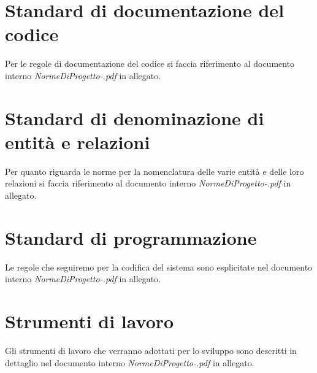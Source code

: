 \section{Standard di documentazione del codice}
Per le regole di documentazione del codice si faccia riferimento al documento
interno \emph{NormeDiProgetto-\versionenormeprogetto.pdf} in allegato.

\section{Standard di denominazione di entit\`a e relazioni}
Per quanto riguarda le norme per la nomenclatura delle varie entit\`a e delle
loro relazioni si faccia riferimento al documento interno
\emph{NormeDiProgetto-\versionenormeprogetto.pdf} in allegato.

\section{Standard di programmazione}
Le regole che seguiremo per la codifica del sistema sono esplicitate nel
documento interno \emph{NormeDiProgetto-\versionenormeprogetto.pdf} in allegato.

\section{Strumenti di lavoro}
Gli strumenti di lavoro che verranno adottati per lo sviluppo sono descritti in
dettaglio nel documento interno \emph{NormeDiProgetto-\versionenormeprogetto.pdf} in
allegato.


